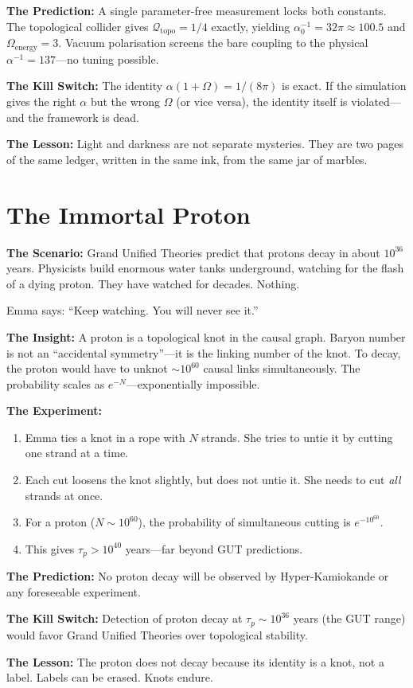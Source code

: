 \documentclass[11pt, a4paper, openany]{book}
\begin{document}
\begin{thoughtexp}
\textbf{The Prediction:} A single parameter-free measurement locks both constants. The topological collider gives $\mathcal{Q}_{\mathrm{topo}} = 1/4$ exactly, yielding $\alpha_0^{-1} = 32\pi \approx 100.5$ and $\Omega_{\mathrm{energy}} = 3$. Vacuum polarisation screens the bare coupling to the physical $\alpha^{-1} = 137$---no tuning possible.

\textbf{The Kill Switch:} The identity $\alpha(1+\Omega) = 1/(8\pi)$ is exact. If the simulation gives the right $\alpha$ but the wrong $\Omega$ (or vice versa), the identity itself is violated---and the framework is dead.

\textbf{The Lesson:} Light and darkness are not separate mysteries. They are two pages of the same ledger, written in the same ink, from the same jar of marbles.
\end{thoughtexp}

\section{The Immortal Proton}
\begin{thoughtexp}
\textbf{The Scenario:} Grand Unified Theories predict that protons decay in about $10^{36}$ years. Physicists build enormous water tanks underground, watching for the flash of a dying proton. They have watched for decades. Nothing.

Emma says: ``Keep watching. You will never see it.''

\textbf{The Insight:} A proton is a topological knot in the causal graph. Baryon number is not an ``accidental symmetry''---it is the linking number of the knot. To decay, the proton would have to unknot ${\sim}10^{60}$ causal links simultaneously. The probability scales as $e^{-N}$---exponentially impossible.

\textbf{The Experiment:}
\begin{enumerate}
  \item Emma ties a knot in a rope with $N$ strands. She tries to untie it by cutting one strand at a time.
  \item Each cut loosens the knot slightly, but does not untie it. She needs to cut \emph{all} strands at once.
  \item For a proton ($N \sim 10^{60}$), the probability of simultaneous cutting is $e^{-10^{60}}$.
  \item This gives $\tau_p > 10^{40}$ years---far beyond GUT predictions.
\end{enumerate}

\textbf{The Prediction:} No proton decay will be observed by Hyper-Kamiokande or any foreseeable experiment.

\textbf{The Kill Switch:} Detection of proton decay at $\tau_p \sim 10^{36}$ years (the GUT range) would favor Grand Unified Theories over topological stability.

\textbf{The Lesson:} The proton does not decay because its identity is a knot, not a label. Labels can be erased. Knots endure.
\end{thoughtexp}
\end{document}
